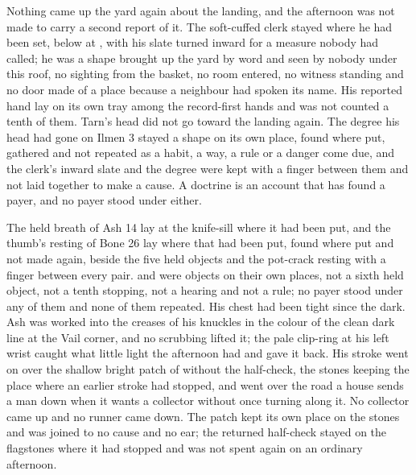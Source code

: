 \scenebreak

Nothing came up the yard again about the landing, and the afternoon was not made to carry a second report of it. The soft-cuffed clerk stayed where he had been set, below  at , with his slate turned inward for a measure nobody had called; he was a shape brought up the yard by word and seen by nobody under this roof, no sighting from the basket, no room entered, no witness standing and no door made of a place because a neighbour had spoken its name. His reported hand lay on its own tray among the record-first hands and was not counted a tenth of them. Tarn's head did not go toward the landing again. The degree his head had gone on Ilmen 3 stayed a shape on its own place, found where put, gathered and not repeated as a habit, a way, a rule or a danger come due, and the clerk's inward slate and the degree were kept with a finger between them and not laid together to make a cause. A doctrine is an account that has found a payer, and no payer stood under either.

The held breath of Ash 14 lay at the knife-sill where it had been put, and the thumb's resting of Bone 26 lay where that had been put, found where put and not made again, beside the five held objects and the pot-crack resting with a finger between every pair.  and  were objects on their own places, not a sixth held object, not a tenth stopping, not a hearing and not a rule; no payer stood under any of them and none of them repeated. His chest had been tight since the dark. Ash was worked into the creases of his knuckles in the colour of the clean dark line at the Vail corner, and no scrubbing lifted it; the pale clip-ring at his left wrist caught what little light the afternoon had and gave it back. His stroke went on over the shallow bright patch of  without the half-check, the stones keeping the place where an earlier stroke had stopped, and went over the road a house sends a man down when it wants a collector without once turning along it. No collector came up and no runner came down. The patch kept its own place on the stones and was joined to no cause and no ear; the returned half-check stayed on the flagstones where it had stopped and was not spent again on an ordinary afternoon.

